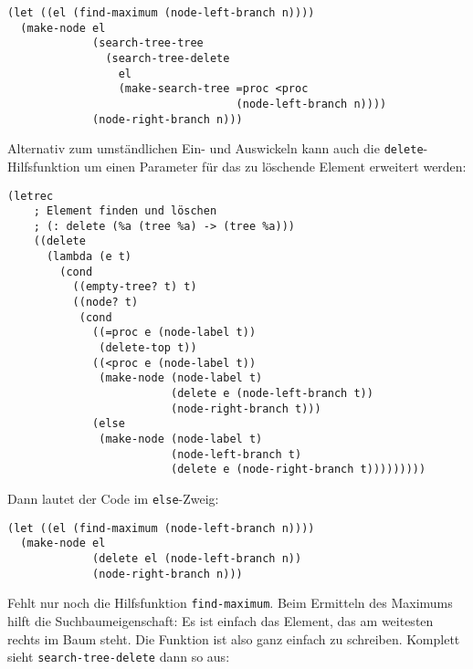 \begin{verbatim}
(let ((el (find-maximum (node-left-branch n))))
  (make-node el
             (search-tree-tree
               (search-tree-delete
                 el
                 (make-search-tree =proc <proc
                                   (node-left-branch n))))
             (node-right-branch n)))
\end{verbatim}
%
Alternativ zum umständlichen Ein-
und Auswickeln kann auch die \texttt{delete}-Hilfsfunktion um einen
Parameter für das zu löschende Element erweitert werden:
%
\begin{verbatim}
(letrec
    ; Element finden und löschen
    ; (: delete (%a (tree %a) -> (tree %a)))
    ((delete
      (lambda (e t)
        (cond
          ((empty-tree? t) t)
          ((node? t)
           (cond
             ((=proc e (node-label t))
              (delete-top t))
             ((<proc e (node-label t))
              (make-node (node-label t)
                         (delete e (node-left-branch t))
                         (node-right-branch t)))
             (else
              (make-node (node-label t)
                         (node-left-branch t)
                         (delete e (node-right-branch t)))))))))
\end{verbatim}
%
Dann lautet der Code im \texttt{else}-Zweig:
%
\begin{verbatim}
(let ((el (find-maximum (node-left-branch n))))
  (make-node el
             (delete el (node-left-branch n))
             (node-right-branch n)))
\end{verbatim}
%
Fehlt nur noch die Hilfsfunktion \texttt{find-maximum}.  Beim
Ermitteln des Maximums hilft die Suchbaumeigenschaft: Es ist einfach
das Element, das am weitesten rechts im Baum steht.  Die Funktion ist
also ganz einfach zu schreiben.  Komplett sieht
\texttt{search-tree-delete} dann so aus:
%
